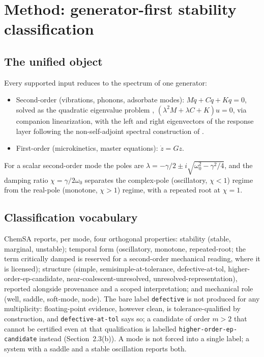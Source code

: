 \section{Method: generator-first stability classification}

\subsection{The unified object}

Every supported input reduces to the spectrum of one generator:
\begin{itemize}
\item Second-order (vibrations, phonons, adsorbate modes): \(M\ddot{q} + C\dot{q} + Kq = 0\), solved as the quadratic eigenvalue problem \citep{tisseur}, \((\lambda^2 M + \lambda C + K)u = 0\), via companion linearization, with the left and right eigenvectors of the response layer following the non-self-adjoint spectral construction of \citet{keldysh}.
\item First-order (microkinetics, master equations): \(\dot{z} = Gz\).
\end{itemize}
For a scalar second-order mode the poles are \(\lambda = -\gamma/2 \pm i\sqrt{\omega_0^2 - \gamma^2/4}\), and the damping ratio \(\chi = \gamma/2\omega_0\) separates the complex-pole (oscillatory, \(\chi<1\)) regime from the real-pole (monotone, \(\chi>1\)) regime, with a repeated root at \(\chi=1\).

\subsection{Classification vocabulary}

ChemSA reports, per mode, four orthogonal properties: stability (stable, marginal, unstable); temporal form (oscillatory, monotone, repeated-root; the term critically damped is reserved for a second-order mechanical reading, where it is licensed); structure (simple, semisimple-at-tolerance, defective-at-tol, higher-order-ep-candidate, near-coalescent-unresolved, unresolved-representation), reported alongside provenance and a scoped interpretation; and mechanical role (well, saddle, soft-mode, node). The bare label \texttt{defective} is not produced for any multiplicity: floating-point evidence, however clean, is tolerance-qualified by construction, and \texttt{defective-at-tol} says so; a candidate of order \(m>2\) that cannot be certified even at that qualification is labelled \texttt{higher-order-ep-candidate} instead (Section~2.3(b)). A mode is not forced into a single label; a system with a saddle and a stable oscillation reports both.


